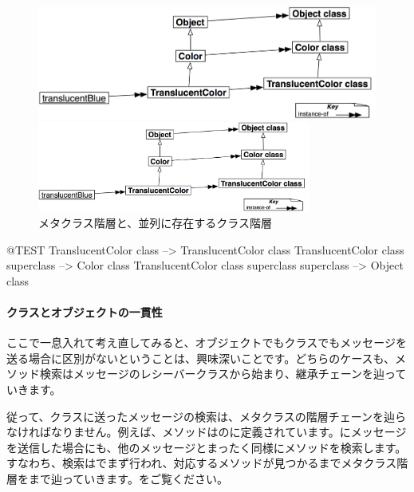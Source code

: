 \documentclass[a4paper,10pt,twoside]{book}
\begin{document}
\begin{center}
\begin{figure}[!ht]
\ifluluelse
	{\centerline {\includegraphics[width=\textwidth]{TranslucentMetaclassHierarchy}}}
	{\centerline {\includegraphics[width=0.8\textwidth]{TranslucentMetaclassHierarchy}}}
\caption{メタクラス階層と、並列に存在するクラス階層}
\end{figure}
\end{center}

\begin{code}{@TEST}
TranslucentColor class                                     --> TranslucentColor class
TranslucentColor class superclass                   --> Color class
TranslucentColor class superclass superclass --> Object class
\end{code}

\paragraph{クラスとオブジェクトの一貫性}
ここで一息入れて考え直してみると、オブジェクトでもクラスでもメッセージを送る場合に区別がないということは、興味深いことです。どちらのケースも、メソッド検索はメッセージのレシーバークラスから始まり、継承チェーンを辿っていきます。

従って、クラスに送ったメッセージの検索は、メタクラスの階層チェーンを辿らなければなりません。例えば、メソッドはのに定義されています。にメッセージを送信した場合にも、他のメッセージとまったく同様にメソッドを検索します。すなわち、検索はでまず行われ、対応するメソッドが見つかるまでメタクラス階層をまで辿っていきます。をご覧ください。
\end{document}
